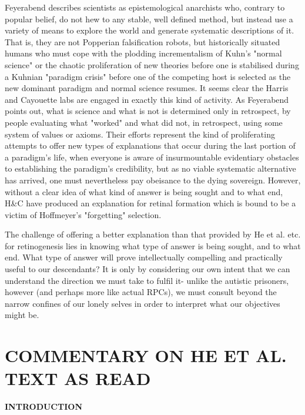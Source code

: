 Feyerabend describes scientists as epistemological anarchists who, contrary to popular belief, do not hew to any stable, well defined method, but instead use a variety of means to explore the world and generate systematic descriptions of it. That is, they are not Popperian falsification robots, but historically situated humans who must cope with the plodding incrementalism of Kuhn's "normal science" or the chaotic proliferation of new theories before one is stabilised during a Kuhnian "paradigm crisis" before one of the competing host is selected as the new dominant paradigm and normal science resumes. It seems clear the Harris and Cayouette labs are engaged in exactly this kind of activity. As Feyerabend points out, what is science and what is not is determined only in retrospect, by people evaluating what "worked" and what did not, in retrospect, using some system of values or axioms. Their efforts represent the kind of proliferating attempts to offer new types of explanations that occur during the last portion of a paradigm's life, when everyone is aware of insurmountable evidentiary obstacles to establishing the paradigm's credibility, but as no viable systematic alternative has arrived, one must nevertheless pay obeisance to the dying sovereign. However, without a clear idea of what kind of answer is being sought and to what end, H\&C have produced an explanation for retinal formation which is bound to be a victim of Hoffmeyer's "forgetting" selection.

The challenge of offering a better explanation than that provided by He et al. etc. for retinogenesis lies in knowing what type of answer is being sought, and to what end. What type of answer will prove intellectually compelling and practically useful to our descendants? It is only by considering our own intent that we can understand the direction we must take to fulfil it- unlike the autistic prisoners, however (and perhaps more like actual RPCs), we must consult beyond the narrow confines of our lonely selves in order to interpret what our objectives might be.



\bigskip

\section{COMMENTARY ON HE ET AL. TEXT AS READ}

\bigskip

\textbf{INTRODUCTION}

\bigskip

